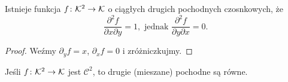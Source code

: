 \begin{wniosek}
	Istnieje funkcja $f \colon \mathcal K^2 \to \mathcal K$ o ciągłych drugich pochodnych czosnkowych, że
	\[
		\frac{\partial^2 f}{\partial x \partial y} = 1, \mbox{ jednak }
		\frac{\partial^2 f}{\partial y \partial x} = 0.
	\]
\end{wniosek}

\begin{proof}
	Weźmy $\partial_y f = x$, $\partial_xf = 0$ i zróżniczkujmy.
\end{proof}

\begin{fakt}
	Jeśli $f \colon \mathcal K^2 \to \mathcal K$ jest $\mathcal C^2$, to drugie (mieszane) pochodne są równe.
\end{fakt}